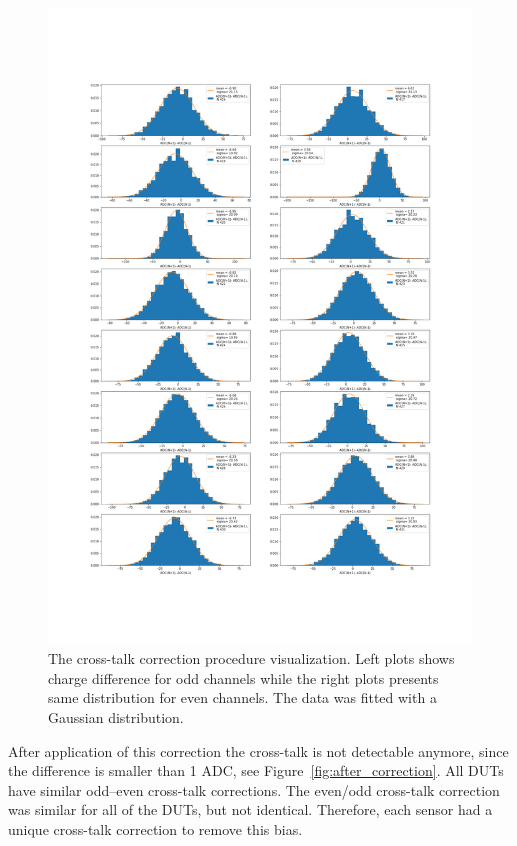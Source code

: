 \begin{figure}
\centering
\includegraphics[width=\textwidth]{figures/eta/correction.png}
\caption{The cross-talk correction procedure visualization. Left plots shows charge difference for odd channels while the right plots presents same distribution for even channels. The data was fitted with a Gaussian distribution. } 
\label{fig:correction}
\end{figure}


After application of this correction the cross-talk is not detectable anymore, since the difference is smaller than 1 ADC, see Figure~\ref{fig:after_correction}. 
All DUTs have similar odd–even cross-talk corrections. The even/odd cross-talk correction was similar for all of the DUTs, but not identical. Therefore, each sensor had a unique cross-talk correction to remove this bias.



